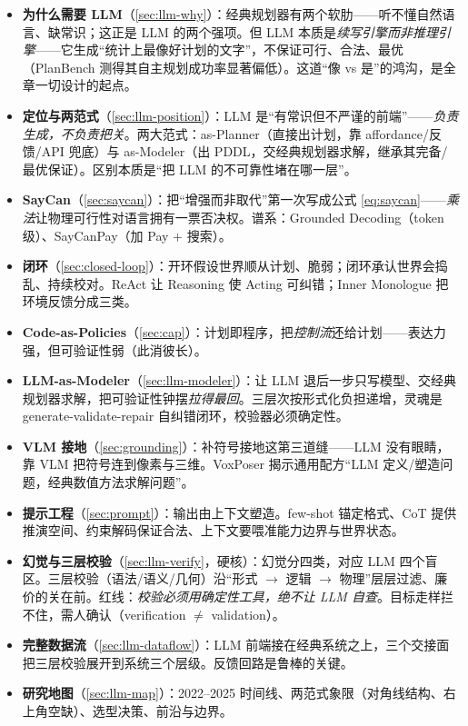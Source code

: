 \begin{itemize}
  \item \textbf{为什么需要 LLM}（\cref{sec:llm-why}）：经典规划器有两个软肋——听不懂自然语言、缺常识；这正是 LLM 的两个强项。但 LLM 本质是\emph{续写引擎而非推理引擎}——它生成“统计上最像好计划的文字”，不保证可行、合法、最优（PlanBench 测得其自主规划成功率显著偏低）。这道“像 vs 是”的鸿沟，是全章一切设计的起点。
  \item \textbf{定位与两范式}（\cref{sec:llm-position}）：LLM 是“有常识但不严谨的前端”——\emph{负责生成，不负责把关}。两大范式：as-Planner（直接出计划，靠 affordance/反馈/API 兜底）与 as-Modeler（出 PDDL，交经典规划器求解，继承其完备/最优保证）。区别本质是“把 LLM 的不可靠性堵在哪一层”。
  \item \textbf{SayCan}（\cref{sec:saycan}）：把“增强而非取代”第一次写成公式 \cref{eq:saycan}——\emph{乘法}让物理可行性对语言拥有一票否决权。谱系：Grounded Decoding（token 级）、SayCanPay（加 Pay $+$ 搜索）。
  \item \textbf{闭环}（\cref{sec:closed-loop}）：开环假设世界顺从计划、脆弱；闭环承认世界会捣乱、持续校对。ReAct 让 Reasoning 使 Acting 可纠错；Inner Monologue 把环境反馈分成三类。
  \item \textbf{Code-as-Policies}（\cref{sec:cap}）：计划即程序，把\emph{控制流}还给计划——表达力强，但可验证性弱（此消彼长）。
  \item \textbf{LLM-as-Modeler}（\cref{sec:llm-modeler}）：让 LLM 退后一步只写模型、交经典规划器求解，把可验证性钟摆\emph{拉得最回}。三层次按形式化负担递增，灵魂是 generate-validate-repair 自纠错闭环，校验器必须确定性。
  \item \textbf{VLM 接地}（\cref{sec:grounding}）：补符号接地这第三道缝——LLM 没有眼睛，靠 VLM 把符号连到像素与三维。VoxPoser 揭示通用配方“LLM 定义/塑造问题，经典数值方法求解问题”。
  \item \textbf{提示工程}（\cref{sec:prompt}）：输出由上下文塑造。few-shot 锚定格式、CoT 提供推演空间、约束解码保证合法、上下文要喂准能力边界与世界状态。
  \item \textbf{幻觉与三层校验}（\cref{sec:llm-verify}，硬核）：幻觉分四类，对应 LLM 四个盲区。三层校验（语法/语义/几何）沿“形式 $\to$ 逻辑 $\to$ 物理”层层过滤、廉价的关在前。红线：\emph{校验必须用确定性工具，绝不让 LLM 自查}。目标走样拦不住，需人确认（verification $\neq$ validation）。
  \item \textbf{完整数据流}（\cref{sec:llm-dataflow}）：LLM 前端接在经典系统之上，三个交接面把三层校验展开到系统三个层级。反馈回路是鲁棒的关键。
  \item \textbf{研究地图}（\cref{sec:llm-map}）：2022--2025 时间线、两范式象限（对角线结构、右上角空缺）、选型决策、前沿与边界。
\end{itemize}

